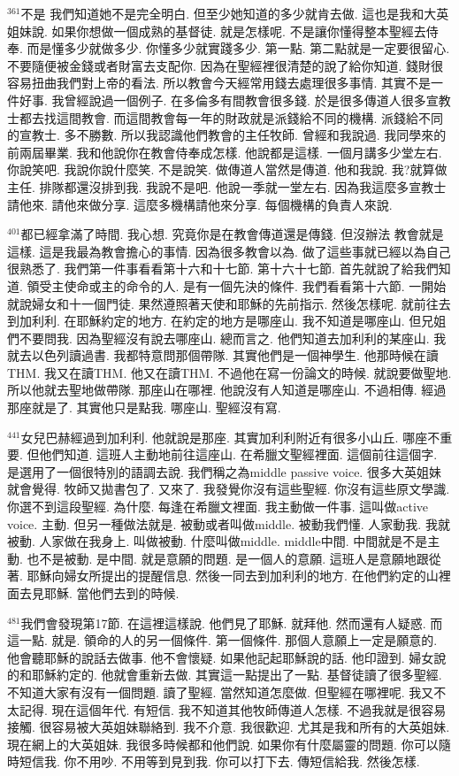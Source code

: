 \documentclass{book}
\begin{document}
$^{361}$不是 我們知道她不是完全明白.
但至少她知道的多少就肯去做.
這也是我和大英姐妹說.
如果你想做一個成熟的基督徒.
就是怎樣呢.
不是讓你懂得整本聖經去侍奉.
而是懂多少就做多少.
你懂多少就實踐多少.
第一點.
第二點就是一定要很留心.
不要隨便被金錢或者財富去支配你.
因為在聖經裡很清楚的說了給你知道.
錢財很容易扭曲我們對上帝的看法.
所以教會今天經常用錢去處理很多事情.
其實不是一件好事.
我曾經說過一個例子.
在多倫多有間教會很多錢.
於是很多傳道人很多宣教士都去找這間教會.
而這間教會每一年的財政就是派錢給不同的機構.
派錢給不同的宣教士.
多不勝數.
所以我認識他們教會的主任牧師.
曾經和我說過.
我同學來的 前兩屆畢業.
我和他說你在教會侍奉成怎樣.
他說都是這樣.
一個月講多少堂左右.
你說笑吧.
我說你說什麼笑.
不是說笑.
做傳道人當然是傳道.
他和我說.
我?就算做主任.
排隊都還沒排到我.
我說不是吧.
他說一季就一堂左右.
因為我這麼多宣教士請他來.
請他來做分享.
這麼多機構請他來分享.
每個機構的負責人來說.

$^{401}$都已經拿滿了時間.
我心想.
究竟你是在教會傳道還是傳錢.
但沒辦法 教會就是這樣.
這是我最為教會擔心的事情.
因為很多教會以為.
做了這些事就已經以為自己很熟悉了.
我們第一件事看看第十六和十七節.
第十六十七節.
首先就說了給我們知道.
領受主使命或主的命令的人.
是有一個先決的條件.
我們看看第十六節.
一開始就說婦女和十一個門徒.
果然遵照著天使和耶穌的先前指示.
然後怎樣呢.
就前往去到加利利.
在耶穌約定的地方.
在約定的地方是哪座山.
我不知道是哪座山.
但兄姐們不要問我.
因為聖經沒有說去哪座山.
總而言之.
他們知道去加利利的某座山.
我就去以色列讀過書.
我都特意問那個帶隊.
其實他們是一個神學生.
他那時候在讀THM.
我又在讀THM.
他又在讀THM.
不過他在寫一份論文的時候.
就說要做聖地.
所以他就去聖地做帶隊.
那座山在哪裡.
他說沒有人知道是哪座山.
不過相傳.
經過那座就是了.
其實他只是點我.
哪座山.
聖經沒有寫.

$^{441}$女兒巴赫經過到加利利.
他就說是那座.
其實加利利附近有很多小山丘.
哪座不重要.
但他們知道.
這班人主動地前往這座山.
在希臘文聖經裡面.
這個前往這個字.
是選用了一個很特別的語調去說.
我們稱之為middle passive voice.
很多大英姐妹就會覺得.
牧師又拋書包了.
又來了.
我發覺你沒有這些聖經.
你沒有這些原文學識.
你選不到這段聖經.
為什麼.
每逢在希臘文裡面.
我主動做一件事.
這叫做active voice.
主動.
但另一種做法就是.
被動或者叫做middle.
被動我們懂.
人家動我.
我就被動.
人家做在我身上.
叫做被動.
什麼叫做middle.
middle中間.
中間就是不是主動.
也不是被動.
是中間.
就是意願的問題.
是一個人的意願.
這班人是意願地跟從著.
耶穌向婦女所提出的提醒信息.
然後一同去到加利利的地方.
在他們約定的山裡面去見耶穌.
當他們去到的時候.

$^{481}$我們會發現第17節.
在這裡這樣說.
他們見了耶穌.
就拜他.
然而還有人疑惑.
而這一點.
就是.
領命的人的另一個條件.
第一個條件.
那個人意願上一定是願意的.
他會聽耶穌的說話去做事.
他不會懷疑.
如果他記起耶穌說的話.
他印證到.
婦女說的和耶穌約定的.
他就會重新去做.
其實這一點提出了一點.
基督徒讀了很多聖經.
不知道大家有沒有一個問題.
讀了聖經.
當然知道怎麼做.
但聖經在哪裡呢.
我又不太記得.
現在這個年代.
有短信.
我不知道其他牧師傳道人怎樣.
不過我就是很容易接觸.
很容易被大英姐妹聯絡到.
我不介意.
我很歡迎.
尤其是我和所有的大英姐妹.
現在網上的大英姐妹.
我很多時候都和他們說.
如果你有什麼屬靈的問題.
你可以隨時短信我.
你不用吵.
不用等到見到我.
你可以打下去.
傳短信給我.
然後怎樣.
\end{document}
